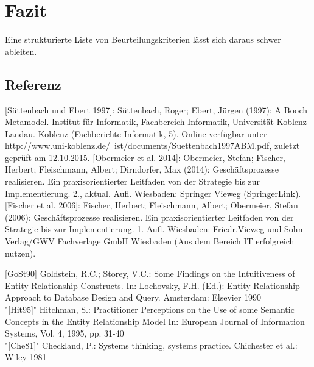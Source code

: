 \chapter{Fazit}


Eine strukturierte Liste von Beurteilungskriterien lässt sich daraus schwer ableiten.

\section{Referenz}
[Süttenbach und Ebert 1997]: Süttenbach, Roger; Ebert, Jürgen (1997): A Booch Metamodel. Institut für Informatik, Fachbereich Informatik, Universität Koblenz-Landau. Koblenz (Fachberichte Informatik, 5). Online verfügbar unter http://www.uni-koblenz.de/~ist/documents/Suettenbach1997ABM.pdf, zuletzt geprüft am 12.10.2015.
[Obermeier et al. 2014]: Obermeier, Stefan; Fischer, Herbert; Fleischmann, Albert; Dirndorfer, Max (2014): Geschäftsprozesse realisieren. Ein praxisorientierter Leitfaden von der Strategie bis zur Implementierung. 2., aktual. Aufl. Wiesbaden: Springer Vieweg (SpringerLink).
[Fischer et al. 2006]: Fischer, Herbert; Fleischmann, Albert; Obermeier, Stefan (2006): Geschäftsprozesse realisieren. Ein praxisorientierter Leitfaden von der Strategie bis zur Implementierung. 1. Aufl. Wiesbaden: Friedr.Vieweg und Sohn Verlag/GWV Fachverlage GmbH Wiesbaden (Aus dem Bereich IT erfolgreich nutzen).

[GoSt90] Goldstein, R.C.; Storey, V.C.: Some Findings on the Intuitiveness of Entity Relationship Constructs.
In: Lochovsky, F.H. (Ed.): Entity Relationship Approach to Database Design and
Query. Amsterdam: Elsevier 1990 \\
"[Hit95]" Hitchman, S.: Practitioner Perceptions on the Use of some Semantic Concepts in the Entity
Relationship Model In: European Journal of Information Systems, Vol. 4, 1995, pp. 31-40\\
"[Che81]" Checkland, P.: Systems thinking, systems practice. Chichester et al.: Wiley 1981\\